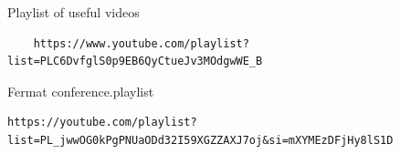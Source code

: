 \documentclass{article}
\theoremstyle{definition}
\theoremstyle{definition}
\theoremstyle{definition}
\begin{document}


















Playlist of useful videos

\begin{verbatim}
    https://www.youtube.com/playlist?list=PLC6DvfglS0p9EB6QyCtueJv3MOdgwWE_B
\end{verbatim}

Fermat conference.playlist
\begin{verbatim}
https://youtube.com/playlist?list=PL_jwwOG0kPgPNUaODd32I59XGZZAXJ7oj&si=mXYMEzDFjHy8lS1D    
\end{verbatim}
\end{document}

